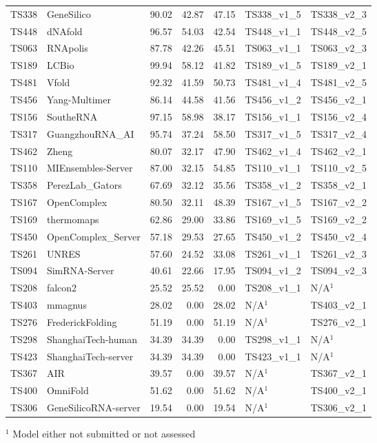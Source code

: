 \begin{table}[ht]
{\begin{tabular}{llrrrll}
TS338 & GeneSilico & 90.02 & 42.87 & 47.15 & TS338\_v1\_5 & TS338\_v2\_3 \\ 
TS448 & dNAfold & 96.57 & 54.03 & 42.54 & TS448\_v1\_1 & TS448\_v2\_5 \\ 
TS063 & RNApolis & 87.78 & 42.26 & 45.51 & TS063\_v1\_1 & TS063\_v2\_3 \\ 
TS189 & LCBio & 99.94 & 58.12 & 41.82 & TS189\_v1\_5 & TS189\_v2\_1 \\ 
TS481 & Vfold & 92.32 & 41.59 & 50.73 & TS481\_v1\_4 & TS481\_v2\_5 \\ 
TS456 & Yang-Multimer & 86.14 & 44.58 & 41.56 & TS456\_v1\_2 & TS456\_v2\_1 \\ 
TS156 & SoutheRNA & 97.15 & 58.98 & 38.17 & TS156\_v1\_1 & TS156\_v2\_4 \\ 
TS317 & GuangzhouRNA\_AI & 95.74 & 37.24 & 58.50 & TS317\_v1\_5 & TS317\_v2\_4 \\ 
TS462 & Zheng & 80.07 & 32.17 & 47.90 & TS462\_v1\_4 & TS462\_v2\_1 \\ 
TS110 & MIEnsembles-Server & 87.00 & 32.15 & 54.85 & TS110\_v1\_1 & TS110\_v2\_5 \\ 
TS358 & PerezLab\_Gators & 67.69 & 32.12 & 35.56 & TS358\_v1\_2 & TS358\_v2\_1 \\ 
TS167 & OpenComplex & 80.50 & 32.11 & 48.39 & TS167\_v1\_5 & TS167\_v2\_2 \\ 
TS169 & thermomaps & 62.86 & 29.00 & 33.86 & TS169\_v1\_5 & TS169\_v2\_2 \\ 
TS450 & OpenComplex\_Server & 57.18 & 29.53 & 27.65 & TS450\_v1\_2 & TS450\_v2\_4 \\ 
TS261 & UNRES & 57.60 & 24.52 & 33.08 & TS261\_v1\_1 & TS261\_v2\_3 \\ 
TS094 & SimRNA-Server & 40.61 & 22.66 & 17.95 & TS094\_v1\_2 & TS094\_v2\_3 \\ 
TS208 & falcon2 & 25.52 & 25.52 & 0.00 & TS208\_v1\_1 & N/A$^{1}$ \\ 
TS403 & mmagnus & 28.02 & 0.00 & 28.02 & N/A$^{1}$ & TS403\_v2\_1 \\ 
TS276 & FrederickFolding & 51.19 & 0.00 & 51.19 & N/A$^{1}$ & TS276\_v2\_1 \\ 
TS298 & ShanghaiTech-human & 34.39 & 34.39 & 0.00 & TS298\_v1\_1 & N/A$^{1}$ \\ 
TS423 & ShanghaiTech-server & 34.39 & 34.39 & 0.00 & TS423\_v1\_1 & N/A$^{1}$ \\ 
TS367 & AIR & 39.57 & 0.00 & 39.57 & N/A$^{1}$ & TS367\_v2\_1 \\ 
TS400 & OmniFold & 51.62 & 0.00 & 51.62 & N/A$^{1}$ & TS400\_v2\_1 \\ 
TS306 & GeneSilicoRNA-server & 19.54 & 0.00 & 19.54 & N/A$^{1}$ & TS306\_v2\_1 \\ 
\bottomrule
\end{tabular}%
}
\begin{flushleft}\footnotesize $^{1}$ Model either not submitted or not assessed\end{flushleft}
\end{table}
